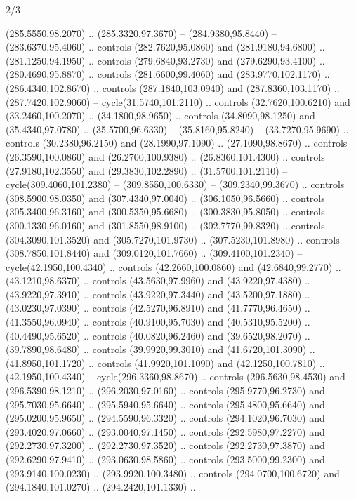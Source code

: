 \begin{flagdescription}{2/3}
\begin{scope}[xshift=0.5\flaglength,yshift=0.5\flagwidth,scale=\stretchfactor]
\begin{scope}[scale=0.001645\flagwidth,yshift=65mm,xshift=-63mm]
\begin{scope}[y=0.80pt, x=0.80pt, yscale=-1,]
\begin{scope}[cm={{1.33333,0.0,0.0,1.33333,(0.0,1e-05)}}]
  (285.5550,98.2070) .. (285.3320,97.3670) -- (284.9380,95.8440) --
  (283.6370,95.4060) .. controls (282.7620,95.0860) and (281.9180,94.6800) ..
  (281.1250,94.1950) .. controls (279.6840,93.2730) and (279.6290,93.4100) ..
  (280.4690,95.8870) .. controls (281.6600,99.4060) and (283.9770,102.1170) ..
  (286.4340,102.8670) .. controls (287.1840,103.0940) and (287.8360,103.1170) ..
  (287.7420,102.9060) -- cycle(31.5740,101.2110) .. controls (32.7620,100.6210)
  and (33.2460,100.2070) .. (34.1800,98.9650) .. controls (34.8090,98.1250) and
  (35.4340,97.0780) .. (35.5700,96.6330) -- (35.8160,95.8240) --
  (33.7270,95.9690) .. controls (30.2380,96.2150) and (28.1990,97.1090) ..
  (27.1090,98.8670) .. controls (26.3590,100.0860) and (26.2700,100.9380) ..
  (26.8360,101.4300) .. controls (27.9180,102.3550) and (29.3830,102.2890) ..
  (31.5700,101.2110) -- cycle(309.4060,101.2380) -- (309.8550,100.6330) --
  (309.2340,99.3670) .. controls (308.5900,98.0350) and (307.4340,97.0040) ..
  (306.1050,96.5660) .. controls (305.3400,96.3160) and (300.5350,95.6680) ..
  (300.3830,95.8050) .. controls (300.1330,96.0160) and (301.8550,98.9100) ..
  (302.7770,99.8320) .. controls (304.3090,101.3520) and (305.7270,101.9730) ..
  (307.5230,101.8980) .. controls (308.7850,101.8440) and (309.0120,101.7660) ..
  (309.4100,101.2340) -- cycle(42.1950,100.4340) .. controls (42.2660,100.0860)
  and (42.6840,99.2770) .. (43.1210,98.6370) .. controls (43.5630,97.9960) and
  (43.9220,97.4380) .. (43.9220,97.3910) .. controls (43.9220,97.3440) and
  (43.5200,97.1880) .. (43.0230,97.0390) .. controls (42.5270,96.8910) and
  (41.7770,96.4650) .. (41.3550,96.0940) .. controls (40.9100,95.7030) and
  (40.5310,95.5200) .. (40.4490,95.6520) .. controls (40.0820,96.2460) and
  (39.6520,98.2070) .. (39.7890,98.6480) .. controls (39.9920,99.3010) and
  (41.6720,101.3090) .. (41.8950,101.1720) .. controls (41.9920,101.1090) and
  (42.1250,100.7810) .. (42.1950,100.4340) -- cycle(296.3360,98.8670) ..
  controls (296.5630,98.4530) and (296.5390,98.1210) .. (296.2030,97.0160) ..
  controls (295.9770,96.2730) and (295.7030,95.6640) .. (295.5940,95.6640) ..
  controls (295.4800,95.6640) and (295.0200,95.9650) .. (294.5590,96.3320) ..
  controls (294.1020,96.7030) and (293.4020,97.0660) .. (293.0040,97.1450) ..
  controls (292.5980,97.2270) and (292.2730,97.3200) .. (292.2730,97.3520) ..
  controls (292.2730,97.3870) and (292.6290,97.9410) .. (293.0630,98.5860) ..
  controls (293.5000,99.2300) and (293.9140,100.0230) .. (293.9920,100.3480) ..
  controls (294.0700,100.6720) and (294.1840,101.0270) .. (294.2420,101.1330) ..

\end{scope}
\end{scope}
\end{scope}
\end{scope}
\end{flagdescription}
